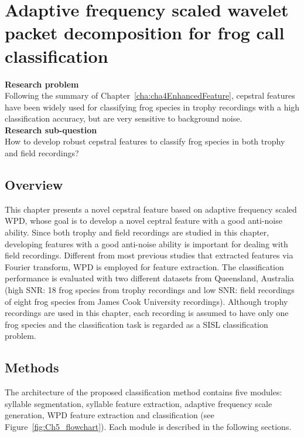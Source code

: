 
\chapter{Adaptive frequency scaled wavelet packet decomposition for frog call classification}
\label{cha:cha5WaveletFeature}


\textbf{Research problem}
\\
Following the summary of Chapter~\ref{cha:cha4EnhancedFeature}, cepstral features have been widely used for classifying frog species in trophy recordings with a high classification accuracy, but are very sensitive to background noise.
\\
\textbf{Research sub-question}
\\
How to develop robust cepstral features to classify frog species in both trophy and field recordings?




\section{Overview}

This chapter presents a novel cepstral feature based on adaptive frequency scaled WPD, whose goal is to develop a novel ceptral feature with a good anti-noise ability.
Since both trophy and field recordings are studied in this chapter, developing features with a good anti-noise ability is important for dealing with field recordings. Different from most previous studies that extracted features via Fourier transform, WPD is employed for feature extraction. The classification performance is evaluated with two different datasets from Queensland, Australia (high SNR: 18 frog species from trophy recordings and low SNR: field recordings of eight frog species from James Cook University recordings).  
Although trophy recordings are used in this chapter, each recording is assumed to have only one frog species and the classification task is regarded as a SISL classification problem.







\section{Methods}
The architecture of the proposed classification method contains five modules: syllable segmentation, syllable feature extraction, adaptive frequency scale generation, WPD feature extraction and classification (see Figure~\ref{fig:Ch5_flowchart}). Each module is described in the following sections. 

